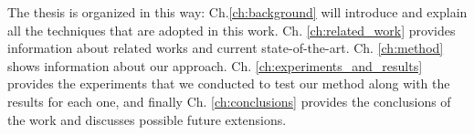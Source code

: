 The thesis is organized in this way: Ch.\ref{ch:background} will introduce and explain all the techniques that are adopted in this work.
Ch. \ref{ch:related_work} provides information about related works and current state-of-the-art.
Ch. \ref{ch:method} shows information about our approach.
Ch. \ref{ch:experiments_and_results} provides the experiments that we conducted to test our method along with the results for each one, and finally Ch. \ref{ch:conclusions} provides the conclusions of the work and discusses possible future extensions.
